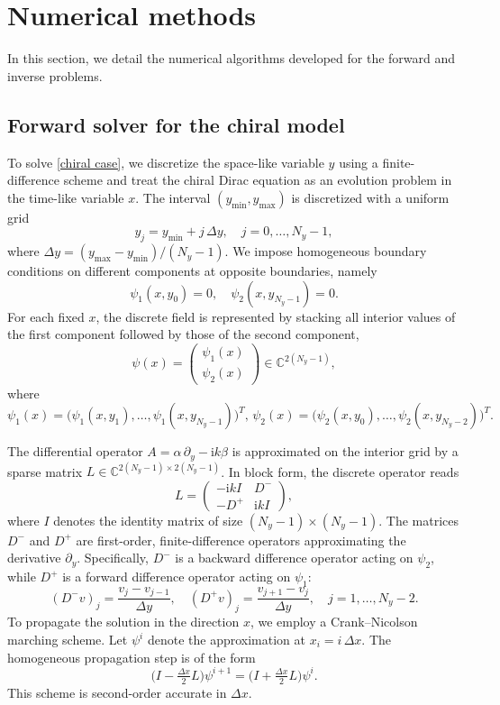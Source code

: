 \documentclass[12pt,reqno]{amsart}
\begin{document}
\section{Numerical methods}
In this section, we detail the numerical algorithms developed for the forward and inverse problems.

\subsection{Forward solver for the chiral model}

To solve \eqref{chiral case}, we discretize the space-like variable $y$
using a finite-difference scheme and treat the chiral Dirac equation as an
evolution problem in the time-like variable $x$.
The interval $(y_{\min},y_{\max})$ is discretized with a uniform grid
\[
y_j = y_{\min} + j\,\Delta y, \quad j=0,\dots,N_y-1,
\]
where $\Delta y=(y_{\max}-y_{\min})/(N_y-1)$.
We impose homogeneous boundary conditions on different components at
opposite boundaries, namely
\[
\psi_1(x,y_0)=0,
\quad
\psi_2(x,y_{N_y-1})=0.
\]
For each fixed $x$, the discrete field is represented by stacking all
interior values of the first component followed by those of the second
component,
\[
\psi(x)
=
\begin{pmatrix}
\psi_1(x)\\
\psi_2(x)
\end{pmatrix}
\in \mathbb C^{2(N_y-1)},
\]
where
\[
\psi_1(x)
=
\big(\psi_1(x,y_1),\dots,\psi_1(x,y_{N_y-1})\big)^{T},\,
\psi_2(x)
=
\big(\psi_2(x,y_0),\dots,\psi_2(x,y_{N_y-2})\big)^{T}.
\]

The differential operator
$A=\alpha\,\partial_y-\mathrm{i}k\beta$
is approximated on the interior grid by a sparse matrix
$L\in\mathbb C^{2(N_y-1)\times 2(N_y-1)}$.
In block form, the discrete operator reads
\begin{equation*}
L
=
\begin{pmatrix}
-\mathrm{i} kI & D^- \\
- D^+ & \mathrm{i} kI
\end{pmatrix},
\end{equation*}
where $I$ denotes the identity matrix of size $(N_y-1)\times(N_y-1)$.
The matrices $D^-$ and $D^+$ are first-order, finite-difference operators
approximating the derivative $\partial_y$.
Specifically, $D^-$ is a backward difference operator acting on $\psi_2$,
while $D^+$ is a forward difference operator acting on $\psi_1$:
\[
(D^- v)_j = \frac{v_j - v_{j-1}}{\Delta y},
\quad
(D^+ v)_j = \frac{v_{j+1} - v_j}{\Delta y},
\quad j=1,\dots,N_y-2.
\]
To propagate the solution in the direction $x$, we employ a
Crank--Nicolson marching scheme.
Let $\psi^i$ denote the approximation at $x_i=i\,\Delta x$.
The homogeneous propagation step is of the form
\begin{equation*}
\bigl(I-\tfrac{\Delta x}{2}L\bigr)\psi^{i+1}
=
\bigl(I+\tfrac{\Delta x}{2}L\bigr)\psi^{i}.
\end{equation*}
This scheme is second-order accurate in $\Delta x$.
\end{document}
